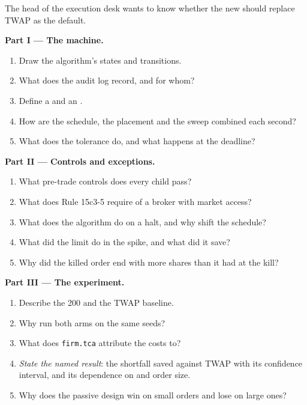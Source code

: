\begin{problem}\label{pb:mx:build-an-execution-algorithm:1}
The head of the execution desk wants to know whether the new  should replace TWAP as the default.

\medskip\noindent\textbf{Part I --- The machine.}
\begin{enumerate}
\item Draw the algorithm's states and transitions.
\item What does the audit log record, and for whom?
\item Define a  and an .
\item How are the schedule, the placement and the sweep combined each second?
\item What does the tolerance do, and what happens at the deadline?
\end{enumerate}

\medskip\noindent\textbf{Part II --- Controls and exceptions.}
\begin{enumerate}[resume]
\item What pre-trade controls does every child pass?
\item What does Rule 15c3-5 require of a broker with market access?
\item What does the algorithm do on a halt, and why shift the schedule?
\item What did the limit do in the spike, and what did it save?
\item Why did the killed order end with more shares than it had at the kill?
\end{enumerate}

\medskip\noindent\textbf{Part III --- The experiment.}
\begin{enumerate}[resume]
\item Describe the 200  and the TWAP baseline.
\item Why run both arms on the same seeds?
\item What does \texttt{firm.tca} attribute the costs to?
\item \emph{State the named result}: the shortfall saved against TWAP with its confidence interval, and its dependence on  and order size.
\item Why does the passive design win on small orders and lose on large ones?
\end{enumerate}


\end{problem}
